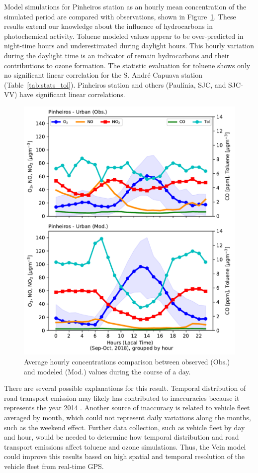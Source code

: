 Model simulations for Pinheiros station as an hourly mean concentration of the simulated period are compared with observations, shown in Figure~\ref{fig:Var_pinh_day}.
These results extend our knowledge about the influence of hydrocarbons in photochemical activity.
Toluene modeled values appear to be over-predicted in night-time hours and underestimated during daylight hours.
This hourly variation during the daylight time is an indicator of remain hydrocarbons and their contributions to ozone formation.
The statistic evaluation for toluene shows only no significant linear correlation for the S. Andr\'{e} Capuava station (Table~\ref{tab:stats_tol}).
Pinheiros station and others (Paul\'{i}nia, SJC, and SJC-VV) have significant linear correlations.



\begin{figure}[ht]
  \centering
  \includegraphics[width=.7\textwidth]{fig/pol_hour_tol.pdf}
  \caption{Average hourly concentrations comparison between observed (Obs.) and modeled (Mod.) values during the course of a day.}
  \label{fig:Var_pinh_day}
\end{figure}

There are several possible explanations for this result.
Temporal distribution of road transport emission may likely has contributed to inaccuracies because it represents the year 2014 \citep{Andrade2015}.
Another source of inaccuracy is related to vehicle fleet averaged by month, which could not represent daily variations along the months, such as the weekend effect.
Further data collection, such as vehicle fleet by day and hour, would be needed to determine how temporal distribution and road transport emissions affect toluene and ozone simulations.
Thus, the Vein model \citep{Ibarra2018} could improve this results based on high spatial and temporal resolution of the vehicle fleet from real-time GPS.



